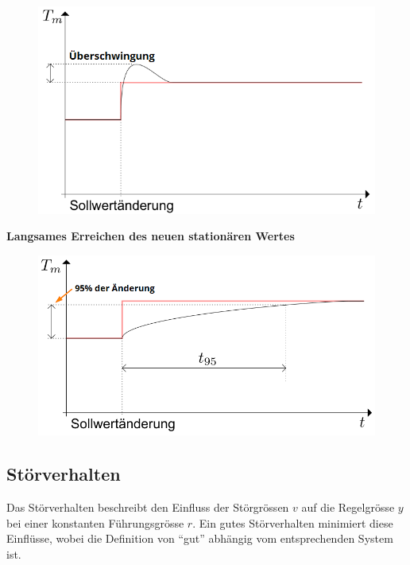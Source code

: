 \documentclass[
  10pt,
  a4paper,
]{article}
\numberwithin{equation}{section}
\begin{document}
\begin{multicols}{2}
\begin{figure}[H]
{\centering \includegraphics{images/fuhrungsverhalten/uberschwingung.png}

}

\end{figure}

\textbf{Langsames Erreichen des neuen stationären Wertes}

\begin{figure}[H]

{\centering \includegraphics{images/fuhrungsverhalten/slow.png}

}

\end{figure}

\hypertarget{stuxf6rverhalten}{%
\subsection{Störverhalten}\label{stuxf6rverhalten}}

Das Störverhalten beschreibt den Einfluss der Störgrössen \(v\) auf die
Regelgrösse \(y\) bei einer konstanten Führungsgrösse \(r\). Ein gutes
Störverhalten minimiert diese Einflüsse, wobei die Definition von
``gut'' abhängig vom entsprechenden System ist.


\end{multicols}
\end{document}
